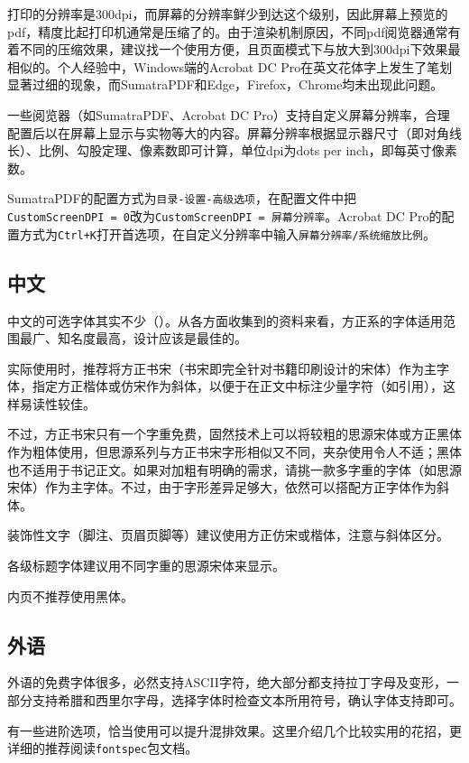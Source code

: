 \documentclass[10pt,openany]{book}
\begin{document}
\begin{sloppypar}
打印的分辨率是300dpi，而屏幕的分辨率鲜少到达这个级别，因此屏幕上预览的pdf，精度比起打印机通常是压缩了的。由于渲染机制原因，不同pdf阅览器通常有着不同的压缩效果，建议找一个使用方便，且页面模式下与放大到300dpi下效果最相似的。个人经验中，Windows端的Acrobat DC Pro在英文花体字上发生了笔划显著过细的现象，而SumatraPDF和Edge，Firefox，Chrome均未出现此问题。

一些阅览器（如SumatraPDF、Acrobat DC Pro）支持自定义屏幕分辨率，合理配置后以在屏幕上显示与实物等大的内容。屏幕分辨率根据显示器尺寸（即对角线长）、比例、勾股定理、像素数即可计算，单位dpi为dots per inch，即每英寸像素数。

SumatraPDF的配置方式为\texttt{目录-设置-高级选项}，在配置文件中把\texttt{CustomScreenDPI\ =\ 0}改为\texttt{CustomScreenDPI\ =\ 屏幕分辨率}。Acrobat DC Pro的配置方式为\texttt{Ctrl+K}打开首选项，在自定义分辨率中输入\texttt{屏幕分辨率/系统缩放比例}。

\subsection{中文}

中文的可选字体其实不少（）。从各方面收集到的资料来看，方正系的字体适用范围最广、知名度最高，设计应该是最佳的。

实际使用时，推荐将方正书宋（书宋即完全针对书籍印刷设计的宋体）作为主字体，指定方正楷体或仿宋作为斜体，以便于在正文中标注少量字符（如引用），这样易读性较佳。

不过，方正书宋只有一个字重免费，固然技术上可以将较粗的思源宋体或方正黑体作为粗体使用，但思源系列与方正书宋字形相似又不同，夹杂使用令人不适；黑体也不适用于书记正文。如果对加粗有明确的需求，请挑一款多字重的字体（如思源宋体）作为主字体。不过，由于字形差异足够大，依然可以搭配方正字体作为斜体。

装饰性文字（脚注、页眉页脚等）建议使用方正仿宋或楷体，注意与斜体区分。

各级标题字体建议用不同字重的思源宋体来显示。

内页不推荐使用黑体。

\subsection{外语}

外语的免费字体很多，必然支持ASCII字符，绝大部分都支持拉丁字母及变形，一部分支持希腊和西里尔字母，选择字体时检查文本所用符号，确认字体支持即可。

有一些进阶选项，恰当使用可以提升混排效果。这里介绍几个比较实用的花招，更详细的推荐阅读\texttt{fontspec}包文档。


\end{sloppypar}
\end{document}
